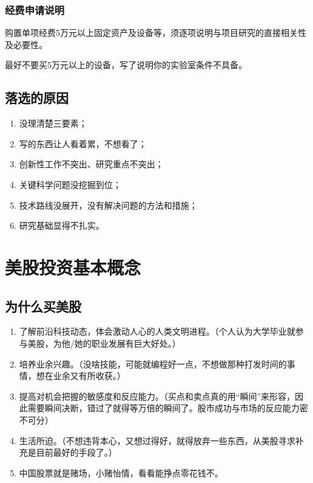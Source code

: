 \subsection{经费申请说明}
购置单项经费5万元以上固定资产及设备等，须逐项说明与项目研究的直接相关性及必要性。

最好不要买5万元以上的设备，写了说明你的实验室条件不具备。



\section{落选的原因}
\begin{enumerate}
\item 没理清楚三要素；
\item 写的东西让人看着累，不想看了；
\item 创新性工作不突出、研究重点不突出；
\item 关键科学问题没挖掘到位；
\item 技术路线没展开，没有解决问题的方法和措施；
\item 研究基础显得不扎实。
\end{enumerate}



\chapter{美股投资基本概念}
\section{为什么买美股}
\begin{enumerate}
\item 了解前沿科技动态，体会激动人心的人类文明进程。（个人认为大学毕业就参与美股，为他/她的职业发展有巨大好处。）

\item 培养业余兴趣。（没啥技能，可能就编程好一点，不想做那种打发时间的事情，想在业余又有所收获。）

\item 提高对机会把握的敏感度和反应能力。（买点和卖点真的用“瞬间”来形容，因此需要瞬间决断，错过了就得等万倍的瞬间了。股市成功与市场的反应能力密不可分）

\item 生活所迫。（不想违背本心，又想过得好，就得放弃一些东西，从美股寻求补充是目前最好的手段了。）

\item 中国股票就是赌场，小赌怡情，看看能挣点零花钱不。
\end{enumerate}



